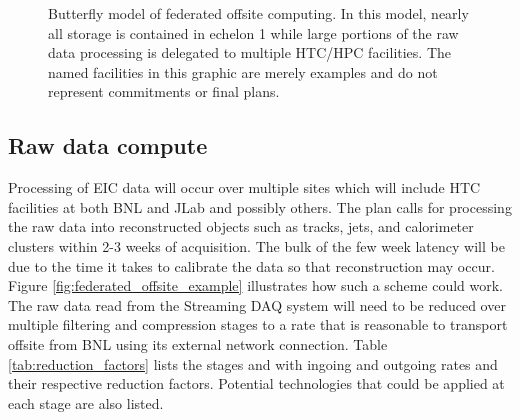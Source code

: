 \begin{figure}[hbt!]
 \begin{center}
  \caption[Federated Computing Butterfly model.]{\label{fig:federated_offsite_butterfly} Butterfly model of federated offsite computing. In this model, nearly all storage is contained in echelon 1 while large portions of the raw data processing is delegated to multiple HTC/HPC facilities. The named facilities in this graphic are merely examples and do not represent commitments or final plans.}
 \end{center}
\end{figure}

\subsection{Raw data compute}
Processing of EIC data will occur over multiple sites which will include HTC facilities at both BNL and JLab and possibly others. The plan calls for processing the raw data into reconstructed objects such as tracks, jets, and calorimeter clusters within 2-3 weeks of acquisition. The bulk of the few week latency will be due to the time it takes to calibrate the data so that reconstruction may occur. Figure \ref{fig:federated_offsite_example} illustrates how such a scheme could work. The raw data read from the Streaming DAQ system will need to be reduced over multiple filtering and compression stages to a rate that is reasonable to transport offsite from BNL using its external network connection. Table \ref{tab:reduction_factors} lists the stages and with ingoing and outgoing rates and their respective reduction factors. Potential technologies that could be applied at each stage are also listed.


